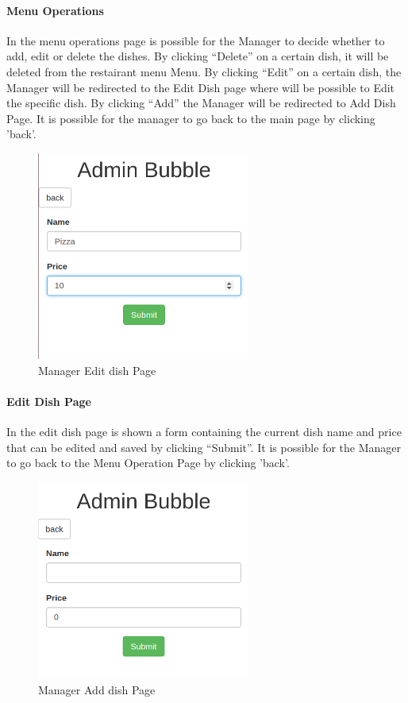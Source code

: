 \paragraph{Menu Operations}
In the menu operations page is possible for the Manager to decide whether to add, edit or delete the dishes.
By clicking ``Delete'' on a certain dish, it will be deleted from the restairant menu Menu.
By clicking ``Edit'' on a certain dish, the Manager will be redirected to the Edit Dish page where will be possible to Edit the specific dish.
By clicking ``Add'' the Manager will be redirected to Add Dish Page.
It is possible for the manager to go back to the main page by clicking 'back'.

\begin{figure}[H]
	\centering
	\includegraphics[width=7cm]{../../documenti/UserManualDemo/demo_screens/admin_edit.png}
	\caption{Manager Edit dish Page}
\end{figure}
\paragraph{Edit Dish Page}
In the edit dish page is shown a form containing the current dish name and price that can be edited and saved by clicking ``Submit''.
It is possible for the Manager to go back to the Menu Operation Page by clicking 'back'.

\begin{figure}[H]
	\centering
	\includegraphics[width=7cm]{../../documenti/UserManualDemo/demo_screens/admin_add.png}
	\caption{Manager Add dish Page}
\end{figure}

